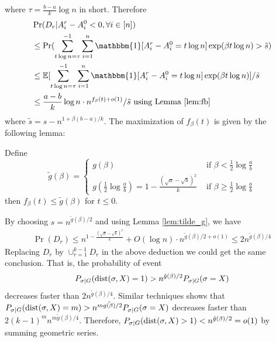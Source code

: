 \documentclass{article}
\begin{document}
where $\tau =\frac{b-a}{k}\log n$ in short. Therefore
\begin{align*}
&\Pr(D_r | A_i^r - A_i^0  < 0, \forall i\in [n])  \\
&\leq\Pr(\sum_{t\log n =\tau}^{-1}\sum_{i=1}^n \mathbbm{1}[A^r_i - A^0_i = t\log n]\exp ( \beta  t\log n)  > \tilde{s} ) \\
& \leq \mathbb{E}[\sum_{t\log n =\tau}^{-1}\sum_{i=1}^n \mathbbm{1}[A^r_i - A^0_i= t\log n]\exp ( \beta  t\log n)] /  \tilde{s} \\
& \leq \frac{a-b}{k}\log n \cdot n^{f_{\beta}(t) + o(1)} / \tilde{s} \textrm{ using Lemma \ref{lem:fb} }
\end{align*}
where $\tilde{s} = s - n^{1+\beta(b-a)/k}$. 
The maximization of $f_{\beta}(t)$ is given by the following lemma:
\begin{lemma}\label{lem:tilde_g}
	Define
	$$
	\tilde{g}(\beta) = \begin{cases}
	g(\beta)   & \text{~if~} \beta< \frac{1}{2}\log\frac{a}{b} \\
	g(\frac{1}{2} \log\frac{a}{b}) = 1 - \frac{(\sqrt{a}-\sqrt{b})^2}{k} & \text{~if~} \beta\ge \frac{1}{2}\log\frac{a}{b}
	\end{cases}
	$$
	then $f_{\beta}(t) \leq \tilde{g}(\beta)$ for $t\leq 0$.
\end{lemma}
By choosing $s = n^{\tilde{g}(\beta)/2}$ and using Lemma \ref{lem:tilde_g}, we have
\begin{align*}
\Pr( D_r) \leq  n^{1-\frac{(\sqrt{a}-\sqrt{b})^2}{k}} + O(\log n)  \cdot n^{\tilde{g}(\beta)/2 + o(1)} \leq 2n^{\tilde{g}(\beta)/4}
\end{align*}
Replacing $D_r$ by $\cup_{r=1}^{k-1} D_r$ in the above deduction we could get the same conclusion.
That is, the probability of event
$$
P_{\sigma | G}(\operatorname{dist}(\sigma, X) = 1) > n^{\tilde{g}(\beta)/2}P_{\sigma | G}(\sigma = X)\label{eq:betastar_xx}
$$
decreases faster than $2n^{\tilde{g}(\beta)/4}$.
Similar techniques shows that $P_{\sigma | G}(\operatorname{dist}(\sigma, X) = m)> n^{m\tilde{g(\beta)}/2}P_{\sigma | G}(\sigma = X)$
decreases faster than $2(k-1)^m n^{m\tilde{g}(\beta)/4}$. Therefore, $P_{\sigma | G}(\operatorname{dist}(\sigma, X) > 1) < n^{\tilde{g}(\beta)/2} = o(1)$ by summing geometric series.
\end{document}
